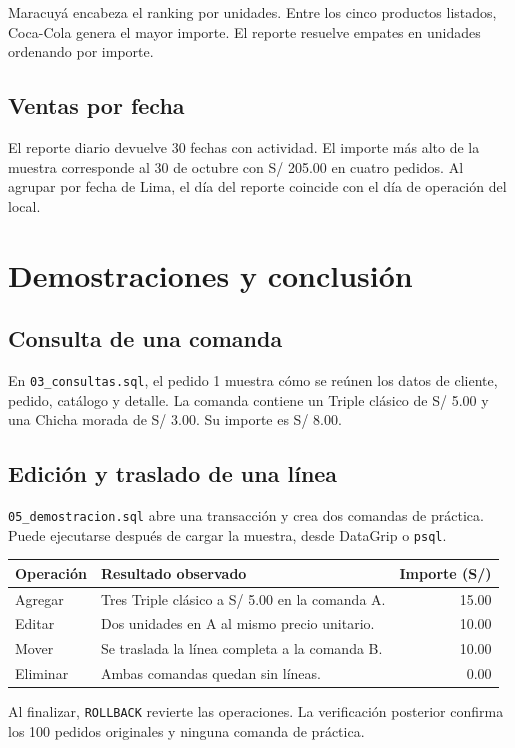 \documentclass[12pt,a4paper]{article}
\newcommand{\campo}[1]{\texttt{#1}}
\begin{document}
Maracuyá encabeza el ranking por unidades. Entre los cinco productos listados, Coca-Cola genera el mayor importe. El reporte resuelve empates en unidades ordenando por importe.

\subsection{Ventas por fecha}
El reporte diario devuelve 30 fechas con actividad. El importe más alto de la muestra corresponde al 30 de octubre con S/ 205.00 en cuatro pedidos. Al agrupar por fecha de Lima, el día del reporte coincide con el día de operación del local.

\clearpage
\section{Demostraciones y conclusión}

\subsection{Consulta de una comanda}
En \campo{03\_consultas.sql}, el pedido 1 muestra cómo se reúnen los datos de cliente, pedido, catálogo y detalle. La comanda contiene un Triple clásico de S/ 5.00 y una Chicha morada de S/ 3.00. Su importe es S/ 8.00.

\subsection{Edición y traslado de una línea}
\campo{05\_demostracion.sql} abre una transacción y crea dos comandas de práctica. Puede ejecutarse después de cargar la muestra, desde DataGrip o \campo{psql}.

\begin{tabularx}{\linewidth}{@{}p{26mm}Yr@{}}
\toprule
\textbf{Operación} & \textbf{Resultado observado} & \textbf{Importe (S/)}\\
\midrule
Agregar & Tres Triple clásico a S/ 5.00 en la comanda A. & 15.00\\
Editar & Dos unidades en A al mismo precio unitario. & 10.00\\
Mover & Se traslada la línea completa a la comanda B. & 10.00\\
Eliminar & Ambas comandas quedan sin líneas. & 0.00\\
\bottomrule
\end{tabularx}

Al finalizar, \campo{ROLLBACK} revierte las operaciones. La verificación posterior confirma los 100 pedidos originales y ninguna comanda de práctica.
\end{document}
